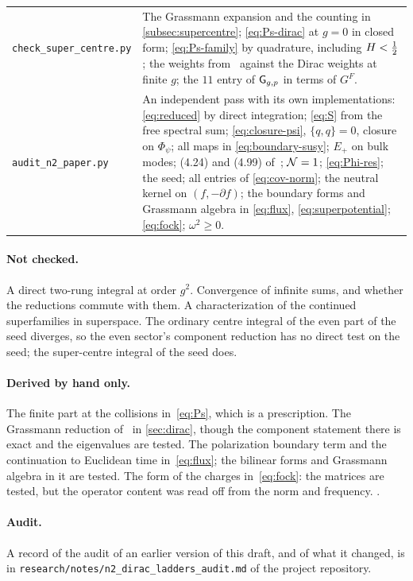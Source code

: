 {\begin{longtable}{@{}p{}p{}@{}}
\texttt{check\_super\_centre.py} & The Grassmann expansion and the counting in \cref{subsec:supercentre}; \eqref{eq:Ps-dirac} at $g=0$ in closed form; \eqref{eq:Ps-family} by quadrature, including $H<\tfrac12$; the weights from~\cite{Peng:2017spg} against the Dirac weights at finite $g$; the $11$ entry of $\mathsf{G}_{g,p}$ in terms of $G^F$.\\
\texttt{audit\_n2\_paper.py} & An independent pass with its own implementations: \eqref{eq:reduced} by direct integration; \eqref{eq:S} from the free spectral sum; \eqref{eq:closure-psi}, $\{q,q\}=0$, closure on $\Phi_\psi$; all maps in \eqref{eq:boundary-susy}; $E_+$ on bulk modes; (4.24) and (4.99) of~\cite{Bulycheva:2018qcp}; $\mathcal{N}=1$; \eqref{eq:Phi-res}; the seed; all entries of \eqref{eq:cov-norm}; the neutral kernel on $(f,-\partial f)$; the boundary forms and Grassmann algebra in \eqref{eq:flux}, \eqref{eq:superpotential}; \eqref{eq:fock}; $\omega^2\ge0$.\\
\bottomrule
\end{longtable}}

\paragraph{Not checked.} A direct two-rung integral at order $g^2$. Convergence of infinite sums, and whether the reductions commute with them. A characterization of the continued superfamilies in superspace. The ordinary centre integral of the even part of the seed diverges, so the even sector's component reduction has no direct test on the seed; the super-centre integral of the seed does.

\paragraph{Derived by hand only.} The finite part at the collisions in~\eqref{eq:Ps}, which is a prescription. The Grassmann reduction of~\cite[(4.42)]{Bulycheva:2018qcp} in \cref{sec:dirac}, though the component statement there is exact and the eigenvalues are tested. The polarization boundary term and the continuation to Euclidean time in~\eqref{eq:flux}; the bilinear forms and Grassmann algebra in it are tested. The form of the charges in~\eqref{eq:fock}: the matrices are tested, but the operator content was read off from the norm and frequency. .

\paragraph{Audit.} A record of the audit of an earlier version of this draft, and of what it changed, is in \texttt{research/notes/n2\_dirac\_ladders\_audit.md} of the project repository.
